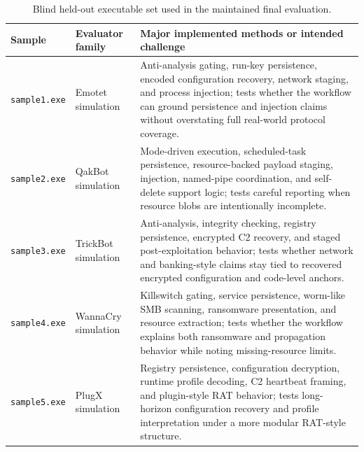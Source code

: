 \begin{table}[p]
\centering
\small
\begin{tabular}{p{} p{} p{}}
\textbf{Sample} & \textbf{Evaluator family} & \textbf{Major implemented methods or intended challenge} \\
\hline
\texttt{sample1.exe} & Emotet simulation & Anti-analysis gating, run-key persistence, encoded configuration recovery, network staging, and process injection; tests whether the workflow can ground persistence and injection claims without overstating full real-world protocol coverage. \\
\texttt{sample2.exe} & QakBot simulation & Mode-driven execution, scheduled-task persistence, resource-backed payload staging, injection, named-pipe coordination, and self-delete support logic; tests careful reporting when resource blobs are intentionally incomplete. \\
\texttt{sample3.exe} & TrickBot simulation & Anti-analysis, integrity checking, registry persistence, encrypted C2 recovery, and staged post-exploitation behavior; tests whether network and banking-style claims stay tied to recovered encrypted configuration and code-level anchors. \\
\texttt{sample4.exe} & WannaCry simulation & Killswitch gating, service persistence, worm-like SMB scanning, ransomware presentation, and resource extraction; tests whether the workflow explains both ransomware and propagation behavior while noting missing-resource limits. \\
\texttt{sample5.exe} & PlugX simulation & Registry persistence, configuration decryption, runtime profile decoding, C2 heartbeat framing, and plugin-style RAT behavior; tests long-horizon configuration recovery and profile interpretation under a more modular RAT-style structure. \\
\end{tabular}
\caption{Blind held-out executable set used in the maintained final evaluation.}
\label{tab:final-heldout-samples}
\end{table}

